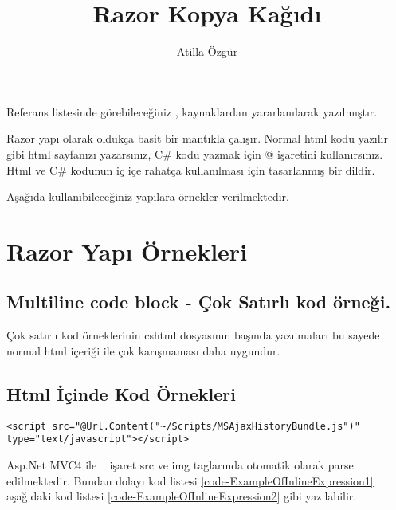 \documentclass[10pt,a4paper]{article}
\newcommand{\authorName}{Atilla \"Ozg\"ur}
\newcommand{\titleName}{Razor Kopya Kağıdı}
\begin{document}
\author{\authorName}
\title{\titleName}



\maketitle



Referans listesinde görebileceğiniz \cite{Haack2011C},\cite{Haley2010Developer} kaynaklardan
yararlanılarak yazılmıştır.


Razor yapı olarak oldukça basit bir mantıkla çalışır.
Normal html kodu yazılır gibi html sayfanızı yazarsınız,
C\# kodu yazmak için @ işaretini kullanırsınız.
Html ve C\# kodunun iç içe rahatça kullanılması için tasarlanmış bir dildir.

Aşağıda kullanıbileceğiniz yapılara örnekler verilmektedir.

\section{Razor Yapı Örnekleri}


\subsection{Multiline code block - Çok Satırlı kod örneği.}

Çok satırlı kod örneklerinin cshtml dosyasının başında yazılmaları bu sayede normal
html içeriği ile çok karışmaması daha uygundur.








\subsection{Html İçinde Kod Örnekleri}


\begin{lstlisting}[label=code-ExampleOfInlineExpression1,caption=html içinde kod örneği 1]
<script src="@Url.Content("~/Scripts/MSAjaxHistoryBundle.js")" type="text/javascript"></script>
\end{lstlisting}

Asp.Net MVC4 ile ~ işaret src ve img taglarında otomatik olarak parse edilmektedir. 
Bundan dolayı kod listesi \ref{code-ExampleOfInlineExpression1} aşağıdaki kod listesi \ref{code-ExampleOfInlineExpression2}  gibi yazılabilir.
\end{document}

